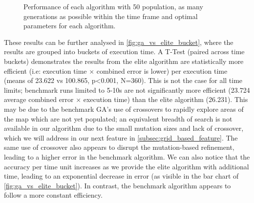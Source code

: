 \documentclass[authoryearcitations]{UoYCSproject}
\begin{document}
\begin{figure}[ht]
	\caption[Effects of elitist against tournament selection (box-plot)]{Performance of each algorithm with 50 population, as many generations as possible within the time frame and optimal parameters for each algorithm.}
	\label{fig:ga_vs_elite_box_whiskers}
\end{figure}

These results can be further analysed in \autoref{fig:ga_vs_elite_bucket}, where the results are grouped into buckets of execution time. A T-Test (paired across time buckets) demonstrates the results from the elite algorithm are statistically more efficient (i.e: execution time $\times$ combined error is lower) per execution time (means of 23.622 vs 100.865, p<0.001, N=360). This is not the case for all time limits; benchmark runs limited to 5-10s are not significantly more efficient (23.724 average combined error $\times$ execution time) than the elite algorithm (26.231). This may be due to the benchmark GA's use of crossovers to rapidly explore areas of the map which are not yet populated; an equivalent breadth of search is not available in our algorithm due to the small mutation sizes and lack of crossover, which we will address in our next feature in \autoref{subsec:grid_based_feature}. The same use of crossover also appears to disrupt the mutation-based refinement, leading to a higher error in the benchmark algorithm. \newline
We can also notice that the accuracy per time unit increases as we provide the elite algorithm with additional time, leading to an exponential decrease in error (as visible in the bar chart of \autoref{fig:ga_vs_elite_bucket}). In contrast, the benchmark algorithm appears to follow a more constant efficiency. \newline
\end{document}
